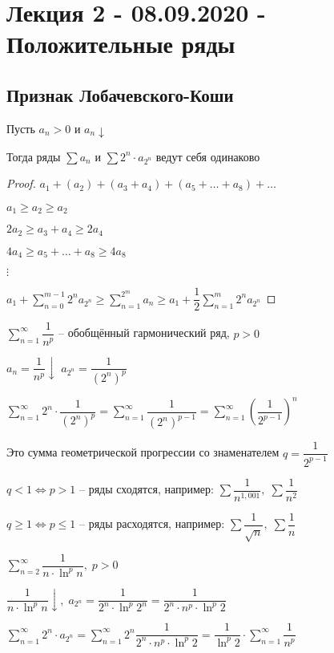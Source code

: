 \section{Лекция 2 - 08.09.2020 - Положительные ряды}
\subsection{Признак Лобачевского-Коши}
\begin{proposal}
    Пусть $a_n > 0$ и $a_n \downarrow$

    Тогда ряды $\sum a_n$ и $\sum 2^n \cdot a_{2^n}$ ведут себя одинаково
\end{proposal}
\begin{proof}
    $a_1 + (a_2) + (a_3 + a_4) + (a_5 + \dots + a_8) + \dots$

	$a_1 \geq a_2 \geq a_2$
	
	$2a_2 \geq a_3 + a_4 \geq 2a_4$
	
	$4a_4 \geq a_5 + \dots + a_8 \geq 4a_8$

    $\vdots$

    $a_1 + \sum_{n=0}^{m - 1} 2^n a_{2^n} \geq \sum_{n = 1}^{2^m} a_n \geq a_1 + \dfrac{1}{2} \sum_{n=1}^{m} 2^n a_{2^n}$

\end{proof}

\begin{example}
    $\sum_{n=1}^{\infty} \dfrac{1}{n^p}$ -- обобщённый гармонический ряд, $p>0$

    $a_n = \dfrac{1}{n^p} \downarrow$\qquad
    $a_{2^n} = \dfrac{1}{\left(2^n\right)^p}$

    $\sum_{n=1}^{\infty} 2^n \cdot \dfrac{1}{\left(2^n\right)^p} = \sum_{n=1}^{\infty} \dfrac{1}{\left(2^n\right)^{p-1}} = \sum_{n=1}^{\infty} \left(\dfrac{1}{2^{p - 1}}\right)^n$

    Это сумма геометрической прогрессии со знаменателем $q = \dfrac{1}{2^{p - 1}}$

    $q < 1 \iff p > 1$ -- ряды сходятся, например: $\sum \dfrac{1}{n^{1,001}},\; \sum \dfrac{1}{n^2}$
    
    $q \geq 1 \iff p \leq 1$ -- ряды расходятся, например: $\sum \dfrac{1}{\sqrt{n}},\; \sum \dfrac{1}{n}$
   
\end{example}

\begin{example}
    $\sum_{n=2}^{\infty} \dfrac{1}{n \cdot \ln^p{n}},\; p > 0$

    $\dfrac{1}{n \cdot \ln^p{n}} \downarrow,\; a_{2^n} = \dfrac{1}{2^n \cdot \ln^p{2^n}} = \dfrac{1}{2^n \cdot n^p \cdot \ln^p{2}}$

    $\sum_{n=1}^{\infty} 2^n \cdot a_{2^n} = \sum_{n=1}^{\infty} 2^n \dfrac{1}{2^n \cdot n^p \cdot \ln^p{2}} = \dfrac{1}{\ln^p 2} \cdot \sum_{n=1}^{\infty} \dfrac{1}{n^p}$
\end{example}

